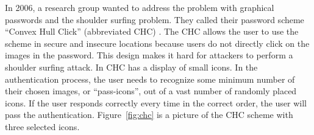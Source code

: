     \begin{figure}[H]
      \centering
    \end{figure}

  In 2006, a research group wanted to address the problem with graphical passwords and the shoulder surfing problem. They called their password scheme ``Convex Hull Click'' (abbreviated CHC) \cite{Wiedenbeck}. The CHC allows the user to use the scheme in secure and insecure locations because users do not directly click on the images in the password. This design makes it hard for attackers to perform a shoulder surfing attack. In CHC has a display of small icons. In the authentication process, the user needs to recognize some minimum number of their chosen images, or ``pass-icons'', out of a vast number of randomly placed icons. If the user responds correctly every time in the correct order, the user will pass the authentication. Figure~\ref{fig:chc} is a picture of the CHC scheme with three selected icons.

